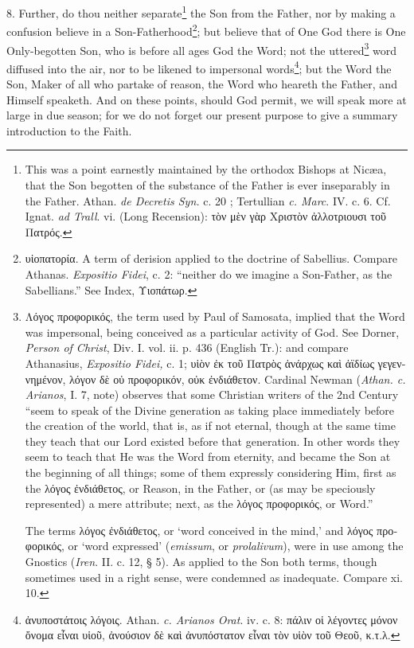 8. Further, do thou neither separate\footnote{This was a point earnestly maintained by the orthodox Bishops at Nicæa, that the Son begotten of the substance of the Father is ever inseparably in the Father. Athan. \emph{de Decretis Syn.} c. 20 ; Tertullian \emph{c. Marc}. IV. c. 6. Cf. Ignat. \emph{ad Trall}. vi. (Long Recension): \textgreek{τὸν μὲν γὰρ Χριστὸν ἀλλοτριουσι τοῦ Πατρός}.} the Son from the Father, nor by making a confusion believe in a Son-Fatherhood\footnote{\textgreek{υἱοπατορία}. A term of derision applied to the doctrine of Sabellius. Compare Athanas. \emph{Expositio Fidei}, c. 2: “neither do we imagine a Son-Father, as the Sabellians.” See Index, \textgreek{Υιοπάτωρ}.}; but believe that of One God there is One Only-begotten Son, who is before all ages God the Word; not the uttered\footnote{\textgreek{Λόγος προφορικός}, the term used by Paul of Samosata, implied that the Word was impersonal, being conceived as a particular activity of God. See Dorner, \emph{Person of Christ}, Div. I. vol. ii. p. 436 (English Tr.): and compare Athanasius, \emph{Expositio Fidei,} c. 1; \textgreek{υἱὸν ἐκ τοῦ Πατρὸς ἀνάρχως καὶ ἀϊδίως γεγεννημένον, λόγον δὲ οὐ προφορικόν, οὐκ ἐνδιάθετον}. Cardinal Newman (\emph{Athan. c. Arianos}, I. 7, note) observes that some Christian writers of the 2nd Century “seem to speak of the Divine generation as taking place immediately before the creation of the world, that is, as if not eternal, though at the same time they teach that our Lord existed before that generation. In other words they seem to teach that He was the Word from eternity, and became the Son at the beginning of all things; some of them expressly considering Him, first as the \textgreek{λόγος ἐνδιάθετος}, or Reason, in the Father, or (as may be speciously represented) a mere attribute; next, as the \textgreek{λόγος προφορικός}, or Word.” \par The terms \textgreek{λόγος ἐνδιάθετος}, or ‘word conceived in the mind,’ and \textgreek{λόγος προφορικός}, or ‘word expressed’ (\emph{emissum}, or \emph{prolalivum}), were in use among the Gnostics (\emph{Iren}. II. c. 12, § 5). As applied to the Son both terms, though sometimes used in a right sense, were condemned as inadequate. Compare xi. 10.} word diffused into the air, nor to be likened to impersonal words\footnote{\textgreek{ἀνυποστάτοις λόγοις}. Athan. \emph{c. Arianos Orat}. iv. c. 8: \textgreek{πάλιν οἱ λέγοντες μόνον ὄνομα εἶναι υἱοῦ, ἀνούσιον δὲ καὶ ἀνυπόστατον εἶναι τὸν υἱὸν τοῦ Θεοῦ, κ.τ.λ.}}; but the Word the Son, Maker of all who partake of reason, the Word who heareth the Father, and Himself speaketh. And on these points, should God permit, we will speak more at large in due season; for we do not forget our present purpose to give a summary introduction to the Faith.

